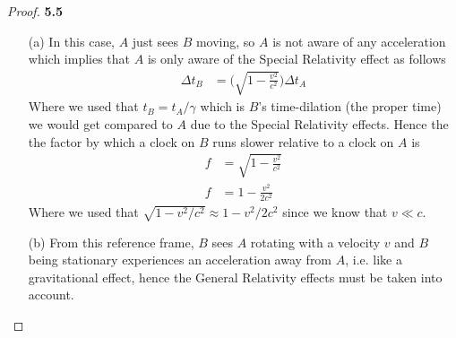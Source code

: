 \documentclass[11pt]{article}
\theoremstyle{definition}
\begin{document}
\begin{proof}{\textbf{5.5}}
\begin{itemize}
    \item [(a)] In this case, $A$ just sees $B$ moving, so $A$ is not aware
    of any acceleration which implies that $A$ is only aware
    of the Special Relativity effect as follows
    \begin{align*}
        \Delta t_B &= \bigg(\sqrt{1 - \frac{v^2}{c^2}}\bigg)\Delta t_{A}
    \end{align*}
    Where we used that $t_B = t_{A}/\gamma$ which is $B$'s
    time-dilation (the proper time) we would get compared to
    $A$ due to the Special Relativity effects.
    Hence the the factor by which a clock on $B$ runs slower relative to a
    clock on $A$ is
    \begin{align*}
        f &= \sqrt{1 - \frac{v^2}{c^2}}\\
        f &= 1 - \frac{v^2}{2c^2}
    \end{align*}
    Where we used that $\sqrt{1 - v^2/c^2} \approx 1 - v^2/2c^2$ since we know
    that $v \ll c$.

    \item [(b)] From this reference frame, $B$ sees $A$ rotating with a
    velocity $v$ and $B$ being stationary experiences an acceleration away
    from $A$, i.e. like a gravitational effect, hence  
    the General Relativity effects must be taken into account.


\end{itemize}
\end{proof}
\end{document}
